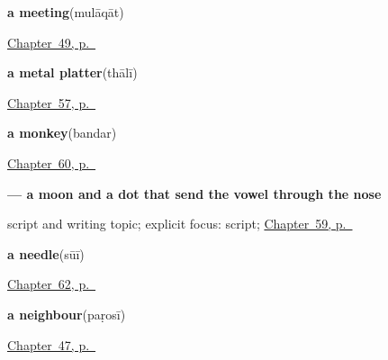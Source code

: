 \noindent\begin{minipage}[t]{\linewidth}
\raggedright
\textbf{a meeting}\enspace\emph{}\enspace(mulāqāt)\par
\footnotesize \hyperref[ch:hi-taking-leave]{Chapter~49, p.~\pageref*{ch:hi-taking-leave}}
\end{minipage}\par\smallskip

\noindent\begin{minipage}[t]{\linewidth}
\raggedright
\textbf{a metal platter}\enspace\emph{}\enspace(thālī)\par
\footnotesize \hyperref[ch:hi-a-gift-and-a-feast]{Chapter~57, p.~\pageref*{ch:hi-a-gift-and-a-feast}}
\end{minipage}\par\smallskip

\noindent\begin{minipage}[t]{\linewidth}
\raggedright
\textbf{a monkey}\enspace\emph{}\enspace(bandar)\par
\footnotesize \hyperref[ch:hi-animals-in-the-yard]{Chapter~60, p.~\pageref*{ch:hi-animals-in-the-yard}}
\end{minipage}\par\smallskip

\noindent\begin{minipage}[t]{\linewidth}
\raggedright
\textbf{ — a moon and a dot that send the vowel through the nose}\par
\footnotesize script and writing topic; explicit focus: script; \hyperref[ch:hi-script-second-wave]{Chapter~59, p.~\pageref*{ch:hi-script-second-wave}}
\end{minipage}\par\smallskip

\noindent\begin{minipage}[t]{\linewidth}
\raggedright
\textbf{a needle}\enspace\emph{}\enspace(sūī)\par
\footnotesize \hyperref[ch:hi-what-hands-work-with]{Chapter~62, p.~\pageref*{ch:hi-what-hands-work-with}}
\end{minipage}\par\smallskip

\noindent\begin{minipage}[t]{\linewidth}
\raggedright
\textbf{a neighbour}\enspace\emph{}\enspace(paṛosī)\par
\footnotesize \hyperref[ch:hi-roles]{Chapter~47, p.~\pageref*{ch:hi-roles}}
\end{minipage}\par\smallskip

